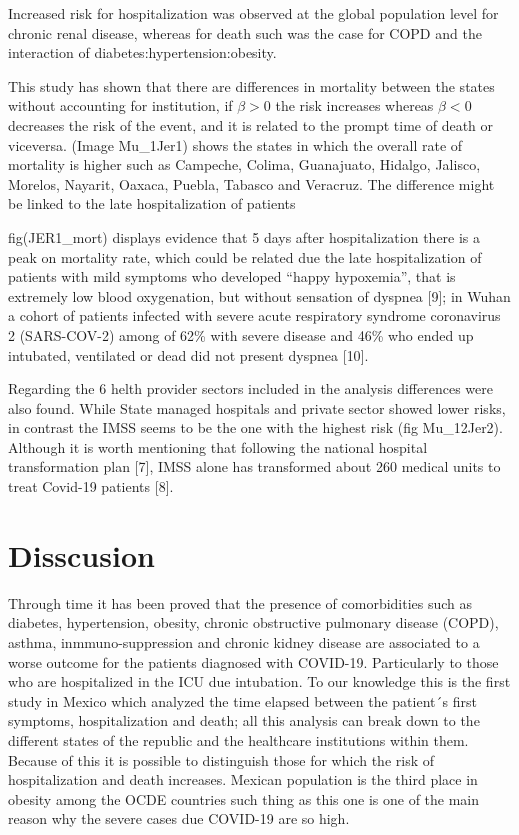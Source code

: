 \documentclass[10pt,letterpaper]{article}
\begin{document}
Increased risk for hospitalization was observed at the global population
level for chronic renal disease, whereas for death such was the case for
COPD and the interaction of diabetes:hypertension:obesity.

This study has shown that there are differences in mortality between the
states without accounting for institution, if \(\beta>0\) the risk
increases whereas \(\beta<0\) decreases the risk of the event, and it is
related to the prompt time of death or viceversa. (Image Mu\_1Jer1)
shows the states in which the overall rate of mortality is higher such
as Campeche, Colima, Guanajuato, Hidalgo, Jalisco, Morelos, Nayarit,
Oaxaca, Puebla, Tabasco and Veracruz. The difference might be linked to
the late hospitalization of patients

fig(JER1\_mort) displays evidence that 5 days after hospitalization
there is a peak on mortality rate, which could be related due the late
hospitalization of patients with mild symptoms who developed ``happy
hypoxemia'', that is extremely low blood oxygenation, but without
sensation of dyspnea {[}9{]}; in Wuhan a cohort of patients infected
with severe acute respiratory syndrome coronavirus 2 (SARS-COV-2) among
of 62\% with severe disease and 46\% who ended up intubated, ventilated
or dead did not present dyspnea {[}10{]}.

Regarding the 6 helth provider sectors included in the analysis
differences were also found. While State managed hospitals and private
sector showed lower risks, in contrast the IMSS seems to be the one with
the highest risk (fig Mu\_12Jer2). Although it is worth mentioning that
following the national hospital transformation plan {[}7{]}, IMSS alone
has transformed about 260 medical units to treat Covid-19 patients
{[}8{]}.

\section{Disscusion}\label{disscusion}

Through time it has been proved that the presence of comorbidities such
as diabetes, hypertension, obesity, chronic obstructive pulmonary
disease (COPD), asthma, inmmuno-suppression and chronic kidney disease
are associated to a worse outcome for the patients diagnosed with
COVID-19. Particularly to those who are hospitalized in the ICU due
intubation. To our knowledge this is the first study in Mexico which
analyzed the time elapsed between the patient´s first symptoms,
hospitalization and death; all this analysis can break down to the
different states of the republic and the healthcare institutions within
them. Because of this it is possible to distinguish those for which the
risk of hospitalization and death increases. Mexican population is the
third place in obesity among the OCDE countries such thing as this one
is one of the main reason why the severe cases due COVID-19 are so high.
\end{document}
